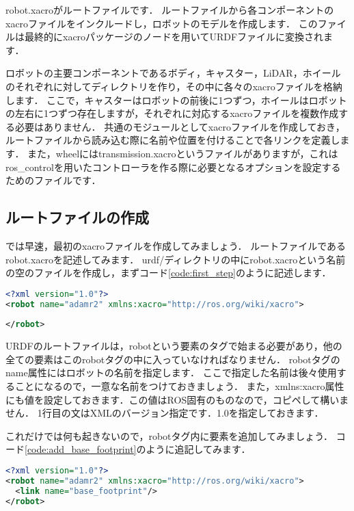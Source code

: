 \documentclass[{../../master}]{subfiles}
\begin{document}
\textsf{robot.xacro}がルートファイルです．
ルートファイルから各コンポーネントのxacroファイルをインクルードし，ロボットのモデルを作成します．
このファイルは最終的に\textsf{xacro}パッケージのノードを用いてURDFファイルに変換されます．

ロボットの主要コンポーネントであるボディ，キャスター，LiDAR，ホイールのそれぞれに対してディレクトリを作り，その中に各々の\textsf{xacro}ファイルを格納します．
ここで，キャスターはロボットの前後に1つずつ，ホイールはロボットの左右に1つずつ存在しますが，それぞれに対応する\textsf{xacro}ファイルを複数作成する必要はありません．
共通のモジュールとして\textsf{xacro}ファイルを作成しておき，ルートファイルから読み込む際に名前や位置を付けることで各リンクを定義します．
また，\textsf{wheel}には\textsf{transmission.xacro}というファイルがありますが，これは\textsf{ros\_control}を用いたコントローラを作る際に必要となるオプションを設定するためのファイルです．

\subsection{ルートファイルの作成}

では早速，最初の\textsf{xacro}ファイルを作成してみましょう．
ルートファイルである\textsf{robot.xacro}を記述してみます．
\textsf{urdf/}ディレクトリの中に\textsf{robot.xacro}という名前の空のファイルを作成し，まずコード\ref{code:first_step}のように記述します．

\begin{lstlisting}[language=XML, label=code:first_step, caption=\textsf{robot.xacro}]
<?xml version="1.0"?>
<robot name="adamr2" xmlns:xacro="http://ros.org/wiki/xacro">
 
</robot>
\end{lstlisting}

URDFのルートファイルは，\textsf{robot}という要素のタグで始まる必要があり，他の全ての要素はこの\textsf{robot}タグの中に入っていなければなりません．\cite{urdf_xml_robot}
\textsf{robot}タグの\textsf{name}属性にはロボットの名前を指定します．
ここで指定した名前は後々使用することになるので，一意な名前をつけておきましょう．
また，\textsf{xmlns:xacro}属性にも値を設定しておきます．この値はROS固有のものなので，コピペして構いません．
1行目の文はXMLのバージョン指定です．1.0を指定しておきます．

これだけでは何も起きないので，\textsf{robot}タグ内に要素を追加してみましょう．
コード\ref{code:add_base_footprint}のように追記してみます．

\begin{lstlisting}[language=XML, label=code:add_base_footprint, caption=\textsf{robot.xacro}]
<?xml version="1.0"?>
<robot name="adamr2" xmlns:xacro="http://ros.org/wiki/xacro">
  <link name="base_footprint"/>
</robot>
\end{lstlisting}
\end{document}
